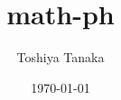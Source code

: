 \documentclass[dvipdfmx, a4paper]{jsarticle}
\title{math-ph}
\author{Toshiya Tanaka}
\date{\today}
\theoremstyle{break}
\begin{document}
	\maketitle
	\nocite{*}
	
	
\end{document}
